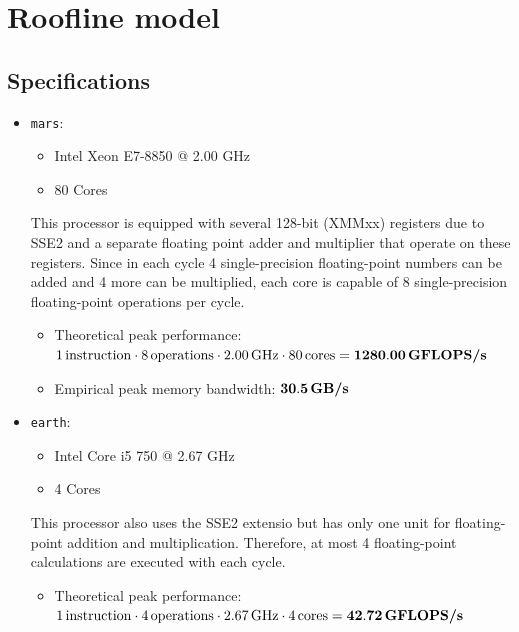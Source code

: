 \documentclass[]{article}
\title{}
\author{}
\begin{document}
\maketitle

\begin{abstract}

\end{abstract}

\section{Roofline model}

\subsection{Specifications}
\begin{itemize}
    \item \texttt{mars}:
        \begin{itemize}
            \item Intel Xeon E7-8850 @ 2.00 GHz
            \item 80 Cores
        \end{itemize}
        This processor is equipped with several 128-bit (XMMxx) registers due to SSE2 and a separate floating point adder and multiplier that operate on these registers. Since in each cycle 4 single-precision floating-point numbers can be added and 4 more can be multiplied, each core is capable of 8 single-precision floating-point operations per cycle. \cite{agnerorg}
        \begin{itemize}
            \item Theoretical peak performance: \\
            $1 \, \text{instruction} \cdot 8 \, \text{operations} \cdot 2.00 \, \text{GHz} \cdot 80 \, \text{cores} = \bold{1280.00} \, \textbf{GFLOPS/s}$
            
            \item Empirical peak memory bandwidth: $\bold{30.5} \, \textbf{GB/s}$ \\
        \end{itemize}
    \item \texttt{earth}:
        \begin{itemize}
            \item Intel Core i5 750 @ 2.67 GHz
            \item 4 Cores
        \end{itemize}
        This processor also uses the SSE2 extensio but has only one unit for floating-point addition and multiplication. Therefore, at most 4 floating-point calculations are executed with each cycle.
        \begin{itemize}
            \item Theoretical peak performance: \\
            $1 \, \text{instruction} \cdot 4 \, \text{operations} \cdot 2.67 \, \text{GHz} \cdot 4 \, \text{cores} = \bold{42.72 \, \textbf{GFLOPS/s}}$
            

\end{itemize}
\end{itemize}
\end{document}
